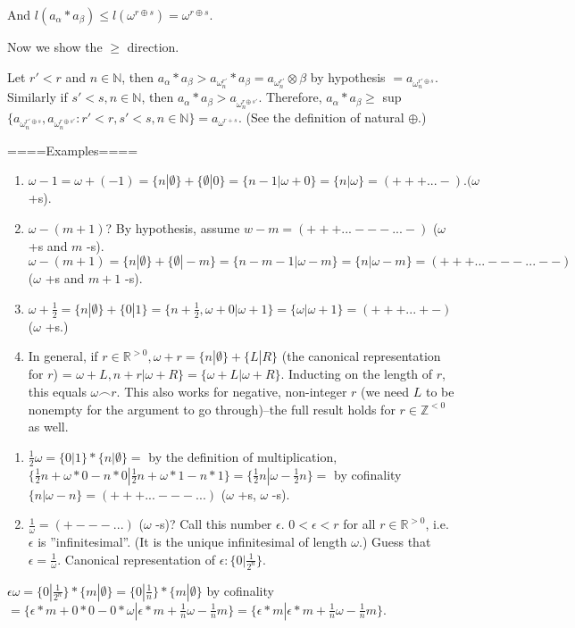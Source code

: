 And $l(a_\alpha * a_\beta) \leq l(\omega^{r \oplus s}) = \omega^{r \oplus s}$.

Now we show the $\geq$ direction.

Let $r'<r$ and $n \in \mathbb{N}$, then $a_\alpha * a_\beta > a_{\omega^{r'}_n} * a_{\beta}=a_{\omega^{r'}_n} \otimes \beta$ by hypothesis $=a_{\omega^{r' \oplus s}_n}$. Similarly if $s'<s, n \in \mathbb{N}$, then $a_\alpha * a_\beta > a_{\omega^{r \oplus s'}_n}$. Therefore, $a_\alpha * a_\beta \geq$ sup $\{a_{\omega^{r' \oplus s}_n}, a_{\omega^{r \oplus s'}_n}  : r' <r, s' <s, n \in \mathbb{N} \} = a_{\omega^{r+s}}$. (See the definition of natural $\oplus$.)

====Examples====

\begin{enumerate}
  \item  $\omega -1 = \omega + (-1) = \{n|\emptyset \} + \{\emptyset|0\}=\{n-1|\omega + 0\}= \{n|\omega\} = (+++...-). (\omega$ +s).
  \item  $\omega - (m+1)$? By hypothesis, assume $w-m = (+++...---...-)$ ($\omega$ +s and $m$ -s). $\omega - (m+1)= \{n|\emptyset \} + \{\emptyset|-m\} = \{n-m-1|\omega -m\} = \{n|\omega-m\} = (+++...---...--)$ ($\omega$ +s and $m+1$ -s).
  \item  $\omega + \frac{1}{2} = \{n|\emptyset \} + \{0|1\} = \{n + \frac{1}{2}, \omega + 0 | \omega +1\} = \{\omega | \omega +1\}=(+++...+-)$ ($\omega$ +s.)
  \item  In general, if $r \in \mathbb{R}^{>0}, \omega + r = \{n|\emptyset \} + \{L|R\}$ (the canonical representation for $r$) = $\omega + L, n+r | \omega +R\} = \{\omega + L | \omega + R \}$. Inducting on the length of $r$, this equals $\omega \frown r$. This also works for negative, non-integer $r$ (we need $L$ to be nonempty for the argument to go through)--the full result holds for $r \in \mathbb{Z}^{<0}$ as well.
\end{enumerate}
\begin{enumerate}
  \item  $\frac{1}{2} \omega = \{0|1\}*\{n|\emptyset \}=$ by the definition of multiplication, $\{\frac{1}{2} n + \omega * 0 - n*0 | \frac{1}{2} n + \omega * 1 - n*1\}=\{\frac{1}{2} n|\omega -\frac{1}{2} n\}=$ by cofinality $\{n|\omega -n\}= (+++...---...)$ ($\omega$ +s, $\omega$ -s).
  \item  $\frac{1}{\omega}= (+---...)$ ($\omega$ -s)? Call this number $\epsilon$. $0<\epsilon <r$ for all $r \in \mathbb{R}^{>0}$, i.e. $\epsilon$ is ''infinitesimal''. (It is the unique infinitesimal of length $\omega$.) Guess that $\epsilon = \frac{1}{\omega}$. Canonical representation of $\epsilon: \{0|\frac{1}{2^n}\}$.
\end{enumerate}
$\epsilon \omega = \{0|\frac{1}{2^n}\}*\{m|\emptyset \}=\{0|\frac{1}{n}\}*\{m|\emptyset \}$ by cofinality $=\{\epsilon *m +0*0-0*\omega|\epsilon *m+\frac{1}{n}\omega - \frac{1}{n}m\}= \{\epsilon *m|\epsilon *m+\frac{1}{n}\omega - \frac{1}{n}m\}.$

